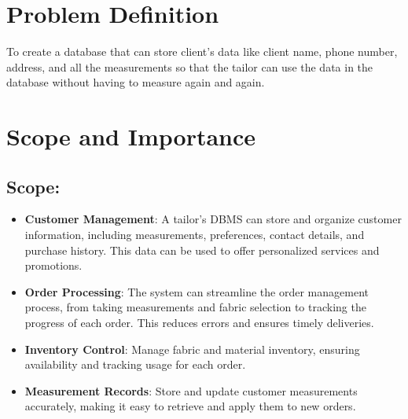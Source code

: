 \documentclass[12pt, letter paper]{report}
\begin{document}
{\section{Problem Definition} 
\begin{spacing}{1.5}
To create a database that can store client’s data like client name, phone number, address, and all the measurements so that the tailor can use the data in the database without having to measure again and again.
\end{spacing}
\section{Scope and Importance}
\subsection{Scope:}
\begin{spacing}{1.5}
\begin{itemize}
\item \textbf{Customer Management}: A tailor's DBMS can store and organize customer information, including measurements, preferences, contact details, and purchase history. This data can be used to offer personalized services and promotions.
\item \textbf{Order Processing}: The system can streamline the order management process, from taking measurements and fabric selection to tracking the progress of each order. This reduces errors and ensures timely deliveries.
\item\textbf{Inventory Control}: Manage fabric and material inventory, ensuring availability and tracking usage for each order.
\item\textbf{Measurement Records}: Store and update customer measurements accurately, making it easy to retrieve and apply them to new orders.
\\
\\

\end{itemize}
\end{spacing}}
\end{document}
